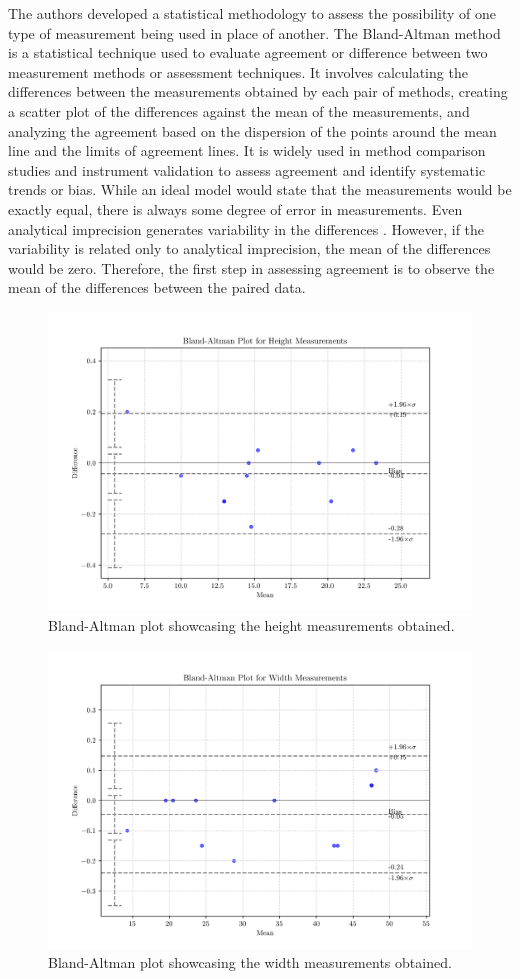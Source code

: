 The authors \textcite{bland1986statistical} developed a statistical methodology to assess the possibility of one type of measurement being used in place of another. The Bland-Altman method is a statistical technique used to evaluate agreement or difference between two measurement methods or assessment techniques. It involves calculating the differences between the measurements obtained by each pair of methods, creating a scatter plot of the differences against the mean of the measurements, and analyzing the agreement based on the dispersion of the points around the mean line and the limits of agreement lines. It is widely used in method comparison studies and instrument validation to assess agreement and identify systematic trends or bias. While an ideal model would state that the measurements would be exactly equal, there is always some degree of error in measurements. Even analytical imprecision generates variability in the differences \cite{giavarina2015understanding}. However, if the variability is related only to analytical imprecision, the mean of the differences would be zero. Therefore, the first step in assessing agreement is to observe the mean of the differences between the paired data.

\begin{figure}[!ht]
    \centering
    \includegraphics[width=0.75\linewidth]{images/chap5/height.png}
    \caption{Bland-Altman plot showcasing the height measurements obtained.}
    \label{fig:Bland-Altman_height}
\end{figure}

\begin{figure}[!ht]
    \centering
    \includegraphics[width=0.75\linewidth]{images/chap5/width.png}
    \caption{Bland-Altman plot showcasing the width measurements obtained.}
    \label{fig:Bland-Altman_width}
\end{figure}


